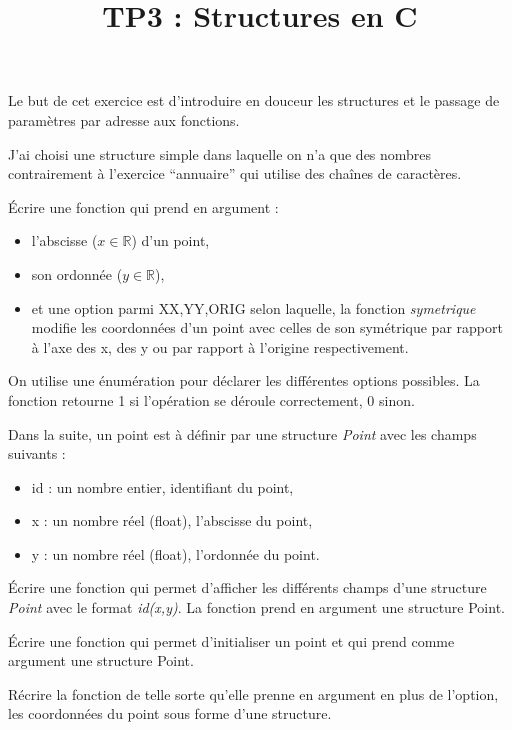 \documentclass[10pt]{article}\usepackage[correction,nu]{esial}
\title{TP3 : Structures en C}
\begin{document}
\maketitle

\begin{Reponse}
Le but de cet exercice est d'introduire en douceur les structures et
le passage de paramètres par adresse aux fonctions.

J'ai choisi une structure simple dans laquelle on n'a que des nombres
contrairement à l'exercice ``annuaire'' qui utilise des chaînes de
caractères.
\end{Reponse}

\begin{Question} Écrire une fonction  qui prend
en argument :
\begin{itemize}
\item l'abscisse ($x \in \mathbb R$) d'un point,
\item son ordonnée ($y \in \mathbb R$),
\item et une option parmi {XX,YY,ORIG} selon laquelle, la fonction
  {\em symetrique} modifie les coordonnées d'un point avec celles de
  son symétrique par rapport à l'axe des x, des y ou par rapport à
  l'origine respectivement.
\end{itemize}
On utilise une énumération pour déclarer les différentes options
possibles. La fonction retourne 1 si l'opération se déroule
correctement, 0 sinon.
\end{Question}

\Question Dans la suite, un point est à définir par une structure {\em
  Point} avec les champs suivants :
\begin{itemize}
\item id : un nombre entier, identifiant du point,
\item x  : un nombre réel (float), l'abscisse du point,
\item y : un nombre réel (float), l'ordonnée du point.
\end{itemize}

\Question Écrire une fonction qui permet d'afficher les différents
champs d'une structure {\em Point} avec le format {\em id(x,y)}. La
fonction prend en argument une structure Point.

\Question Écrire une fonction qui permet d'initialiser un point et qui
prend comme argument une structure Point. 

\Question Récrire la fonction  de telle
sorte qu'elle prenne en argument en plus de l'option, les coordonnées
du point sous forme d'une structure.
\end{document}
